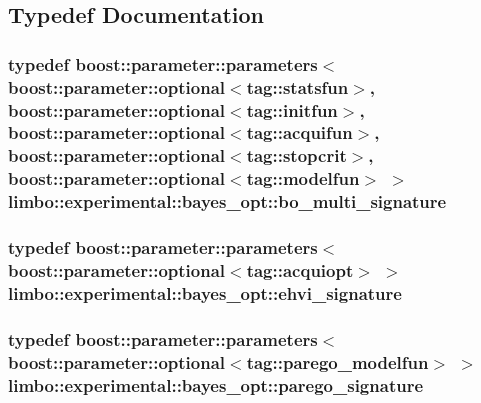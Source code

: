 \subsection{Typedef Documentation}
\hypertarget{namespacelimbo_1_1experimental_1_1bayes__opt_a917a3d4ba3c92a91c3664f9e3ab91057}{}
\subsubsection[{bo\+\_\+multi\+\_\+signature}]{\setlength{\rightskip}{0pt plus 5cm}typedef boost\+::parameter\+::parameters$<$boost\+::parameter\+::optional$<$tag\+::statsfun$>$, boost\+::parameter\+::optional$<$tag\+::initfun$>$, boost\+::parameter\+::optional$<$tag\+::acquifun$>$, boost\+::parameter\+::optional$<$tag\+::stopcrit$>$, boost\+::parameter\+::optional$<$tag\+::modelfun$>$ $>$ {\bf limbo\+::experimental\+::bayes\+\_\+opt\+::bo\+\_\+multi\+\_\+signature}}\label{namespacelimbo_1_1experimental_1_1bayes__opt_a917a3d4ba3c92a91c3664f9e3ab91057}
\hypertarget{namespacelimbo_1_1experimental_1_1bayes__opt_aa9273d3d9c89937c8da1850d0174d3ff}{}
\subsubsection[{ehvi\+\_\+signature}]{\setlength{\rightskip}{0pt plus 5cm}typedef boost\+::parameter\+::parameters$<$boost\+::parameter\+::optional$<$tag\+::acquiopt$>$ $>$ {\bf limbo\+::experimental\+::bayes\+\_\+opt\+::ehvi\+\_\+signature}}\label{namespacelimbo_1_1experimental_1_1bayes__opt_aa9273d3d9c89937c8da1850d0174d3ff}
\hypertarget{namespacelimbo_1_1experimental_1_1bayes__opt_aa1bdc78504860120d6bc0f395f986f57}{}
\subsubsection[{parego\+\_\+signature}]{\setlength{\rightskip}{0pt plus 5cm}typedef boost\+::parameter\+::parameters$<$boost\+::parameter\+::optional$<$tag\+::parego\+\_\+modelfun$>$ $>$ {\bf limbo\+::experimental\+::bayes\+\_\+opt\+::parego\+\_\+signature}}\label{namespacelimbo_1_1experimental_1_1bayes__opt_aa1bdc78504860120d6bc0f395f986f57}
